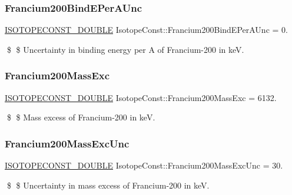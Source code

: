 \subsubsection{\texorpdfstring{Francium200\+Bind\+E\+Per\+A\+Unc}{Francium200BindEPerAUnc}}
{\footnotesize\ttfamily \mbox{\hyperlink{group___isotope_const-_macros_ga8f45a7272ce02c0b4c65c44636ed719a}{I\+S\+O\+T\+O\+P\+E\+C\+O\+N\+S\+T\+\_\+\+D\+O\+U\+B\+LE}} Isotope\+Const\+::\+Francium200\+Bind\+E\+Per\+A\+Unc = 0.}

\$ \$ Uncertainty in binding energy per A of Francium-\/200 in keV. \mbox{\label{group___isotope_const-_francium-_fr200_gac64ce48da6687314b5fdafd8c34c0d86}} 
\subsubsection{\texorpdfstring{Francium200\+Mass\+Exc}{Francium200MassExc}}
{\footnotesize\ttfamily \mbox{\hyperlink{group___isotope_const-_macros_ga8f45a7272ce02c0b4c65c44636ed719a}{I\+S\+O\+T\+O\+P\+E\+C\+O\+N\+S\+T\+\_\+\+D\+O\+U\+B\+LE}} Isotope\+Const\+::\+Francium200\+Mass\+Exc = 6132.}

\$ \$ Mass excess of Francium-\/200 in keV. \mbox{\label{group___isotope_const-_francium-_fr200_gacf0a8ca7e52bace12f6cbce2523c4af0}} 
\subsubsection{\texorpdfstring{Francium200\+Mass\+Exc\+Unc}{Francium200MassExcUnc}}
{\footnotesize\ttfamily \mbox{\hyperlink{group___isotope_const-_macros_ga8f45a7272ce02c0b4c65c44636ed719a}{I\+S\+O\+T\+O\+P\+E\+C\+O\+N\+S\+T\+\_\+\+D\+O\+U\+B\+LE}} Isotope\+Const\+::\+Francium200\+Mass\+Exc\+Unc = 30.}

\$ \$ Uncertainty in mass excess of Francium-\/200 in keV. \mbox{\label{group___isotope_const-_francium-_fr200_gae8903fd08e2188f3dbf8c76d46d59919}} 
